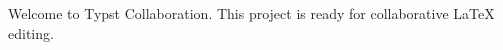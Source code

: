 \documentclass{article}
\begin{document}
Welcome to Typst Collaboration. This project is ready for collaborative LaTeX editing.
\end{document}
